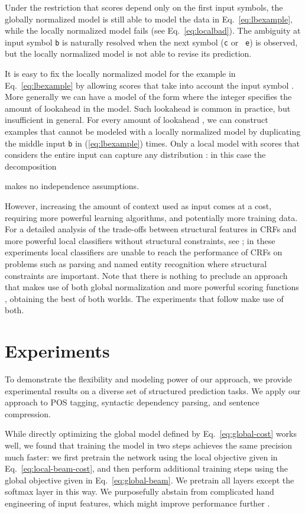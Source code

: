\documentclass[11pt]{article}
\begin{document}
 

Under the restriction that scores 
depend only on the first  input symbols,
the globally normalized model is still able to model the data in
Eq.~\eqref{eq:lbexample}, while the locally normalized model
fails (see Eq.~\ref{eq:localbad}). The ambiguity at input symbol
{\tt b} is naturally resolved when the next symbol ({\tt c} or {\tt
  e}) is observed, but the locally normalized model is not able to
revise its prediction.

It is easy to fix the locally normalized model for the example
in Eq.~\eqref{eq:lbexample} by
allowing scores  that 
take into account the input symbol . 
More generally we can have a model of the form 
where the integer  specifies the amount of lookahead in the model.
Such lookahead is common in practice, but insufficient in general.
For every amount of lookahead , 
we can construct examples that cannot be modeled
with a locally normalized model
by duplicating the middle input {\tt b} in (\ref{eq:lbexample})  times.
Only a local model with scores
 that considers the entire
input can capture any distribution :
in this case the decomposition

makes no independence assumptions.

However, increasing the amount of context used as input comes
at a cost, requiring more powerful learning algorithms, and
potentially more training data. For a detailed analysis of the trade-offs
between structural features in CRFs and more powerful local classifiers
without structural constraints,
see ; in these experiments local classifiers
are unable to reach the performance of CRFs on problems such as parsing
and named entity recognition where structural constraints are important.
Note that there is nothing to preclude an approach that makes use of
both global normalization and more powerful scoring functions
, obtaining the best of both worlds.
The experiments that follow make use of both.
 \section{Experiments}
\label{sec:experiments}

To demonstrate the flexibility and modeling power of our approach, we provide
experimental results on a diverse set of structured prediction tasks.
We apply our approach to POS tagging, syntactic dependency parsing, and sentence
compression.

While directly optimizing the global model defined by Eq.~\eqref{eq:global-cost} works well,
we found that training the model in two steps
achieves the same precision much faster:
we first pretrain the network using the local objective given in Eq.~\eqref{eq:local-beam-cost},
and then perform additional training steps using the global objective given in Eq.~\eqref{eq:global-beam}.
We pretrain all layers except the softmax layer in this way.
We purposefully abstain from complicated hand engineering
of input features, 
which might improve performance further \cite{durrett-klein:2015:ACL}.
\end{document}
